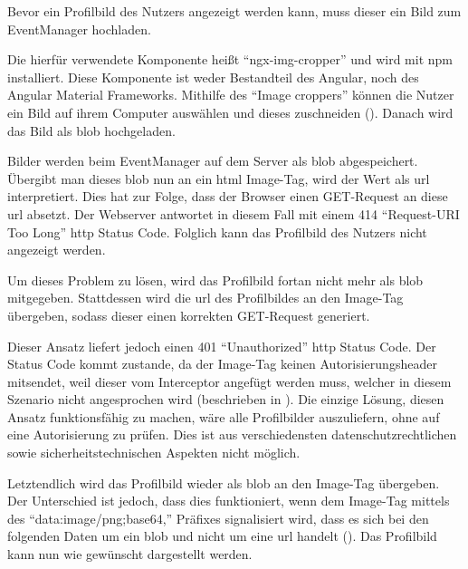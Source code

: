 

Bevor ein Profilbild des Nutzers angezeigt werden kann, muss dieser ein Bild zum EventManager hochladen.

Die hierfür verwendete Komponente heißt \enquote{ngx-img-cropper} und wird mit \gls{npm} installiert. Diese Komponente ist weder Bestandteil des Angular, noch des Angular Material Frameworks. Mithilfe des \enquote{Image croppers} können die Nutzer ein Bild auf ihrem Computer auswählen und dieses zuschneiden (). Danach wird das Bild als \gls{blob} hochgeladen.


Bilder werden beim EventManager auf dem Server als \gls{blob} abgespeichert.
Übergibt man dieses \gls{blob} nun an ein \gls{html} Image-Tag, wird der Wert als \gls{url} interpretiert. Dies hat zur Folge, dass der Browser einen GET-Request an diese \gls{url} absetzt. Der Webserver antwortet in diesem Fall mit einem 414 \enquote{Request-URI Too Long} \gls{http} Status Code. Folglich kann das Profilbild des Nutzers nicht angezeigt werden.

Um dieses Problem zu lösen, wird das Profilbild fortan nicht mehr als \gls{blob} mitgegeben. Stattdessen wird die \gls{url} des Profilbildes an den Image-Tag übergeben, sodass dieser einen korrekten GET-Request generiert.

Dieser Ansatz liefert jedoch einen 401 \enquote{Unauthorized} \gls{http} Status Code. Der Status Code kommt zustande, da der Image-Tag keinen Autorisierungsheader mitsendet, weil dieser vom Interceptor angefügt werden muss, welcher in diesem Szenario nicht angesprochen wird (beschrieben in ). Die einzige Lösung, diesen Ansatz funktionsfähig zu machen, wäre alle Profilbilder auszuliefern, ohne auf eine Autorisierung zu prüfen. Dies ist aus verschiedensten datenschutzrechtlichen sowie sicherheitstechnischen Aspekten nicht möglich.


Letztendlich wird das Profilbild wieder als \gls{blob} an den Image-Tag übergeben. Der Unterschied ist jedoch, dass dies funktioniert, wenn dem Image-Tag mittels des \enquote{data:image/png;base64,} Präfixes signalisiert wird, dass es sich bei den folgenden Daten um ein \gls{blob} und nicht um eine \gls{url} handelt ().
Das Profilbild kann nun wie gewünscht dargestellt werden.
